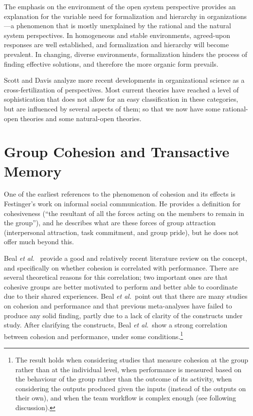 The emphasis on the environment of the open system perspective provides an explanation for the variable need for formalization and hierarchy in organizations---a phenomenon that is mostly unexplained by the rational and the natural system perspectives. In homogeneous and stable environments, agreed-upon responses are well established, and formalization and hierarchy will become prevalent. In changing, diverse environments, formalization hinders the process of finding effective solutions, and therefore the more organic form prevails.

Scott and Davis analyze more recent developments in organizational science as a cross-fertilization of perspectives. Most current theories have reached a level of sophistication that does not allow for an easy classification in these categories, but are influenced by several aspects of them; so that we now have some rational-open theories and some natural-open theories.


\section{Group Cohesion and Transactive Memory}
\label{sec:Cohesion}
\label{sec:Transactive}
\label{sec:WorkPatterns}

One of the earliest references to the phenomenon of cohesion and its effects is Festinger's  work on informal social communication. He provides a definition for cohesiveness (``the resultant of all the forces acting on the members to remain in the group''), and he describes what are these forces of group attraction (interpersonal attraction, task commitment, and group pride), but he does not offer much beyond this.

Beal \emph{et al.}\  provide a good and relatively recent literature review on the concept, and specifically on whether cohesion is correlated with performance. There are several theoretical reasons for this correlation; two important ones are that cohesive groups are better motivated to perform and better able to coordinate due to their shared experiences. Beal \emph{et al.}\ point out that there are many studies on cohesion and performance and that previous meta-analyses have failed to produce any solid finding, partly due to a lack of clarity of the constructs under study. After clarifying the constructs, Beal \emph{et al.}\ show a strong correlation between cohesion and performance, under some conditions.\footnote{The result holds when considering studies that measure cohesion at the group rather than at the individual level, when performance is measured based on the behaviour of the group rather than the outcome of its activity, when considering the outputs produced given the inputs (instead of the outputs on their own), and when the team workflow is complex enough (see following discussion).}

